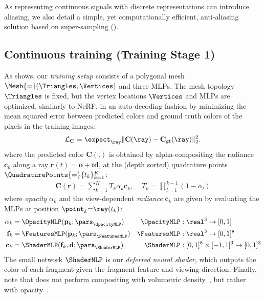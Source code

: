 As representing continuous signals with discrete representations can introduce aliasing, we also detail a simple, yet computationally efficient, anti-aliasing solution based on super-sampling ().


\subsection{Continuous training (Training Stage 1)}
\label{sec:stage1}
As  shows, our \textit{training setup} consists of a polygonal mesh $\Mesh{=}(\Triangles,\Vertices)$ and three MLPs.
The mesh topology $\Triangles$ is fixed, but the vertex locations $\Vertices$ and MLPs are optimized, similarly to NeRF, in an auto-decoding fashion by minimizing the mean squared error between predicted colors and ground truth colors of the pixels in the training images\floatersfootnote{}:
\begin{align}
\mathcal{L}_\mathbf{C} = \expect_{\ray}
\| \mathbf{C}(\ray) - \mathbf{C}_\text{gt}(\ray) \|_2^2.
\label{eq:rgb_reconstruction}
\end{align}
where the predicted color $\mathbf{C}(.)$ is obtained by alpha-compositing the radiance $\mathbf{c}_k$ along a ray $\mathbf{r}(t) {=} \mathbf{o} + t \mathbf{d}$, at the (depth sorted) quadrature points $\QuadraturePoints{=}\{t_k\}_{k=1}^K$:
\begin{align}
\mathbf{C}(\mathbf{r}) =
\sum_{k = 1}^{K}
T_k \alpha_k \mathbf{c}_k, \;\;\;\;
T_k = \prod_{l=1}^{k-1}(1-\alpha_l)
\label{eq:alpha_compositing}
\end{align}
where \textit{opacity} $\alpha_k$ and the view-dependent \textit{radiance} $\mathbf{c}_k$ are given by evaluating the MLPs at position $\point_k {=} \ray(t_k)$:
\begin{align}
\alpha_k &= \OpacityMLP(\mathbf{p}_k; \pars_\OpacityMLP)& \OpacityMLP &: \real^3 \rightarrow [0,1]
\label{eq:opacity}
\\
\mathbf{f}_k &= \FeaturesMLP(\mathbf{p}_k; \pars_\FeaturesMLP)& \FeaturesMLP &: \real^3 \rightarrow [0,1]^8
\label{eq:features}
\\
\mathbf{c}_k &= \ShaderMLP(\mathbf{f}_k,\mathbf{d}; \pars_\ShaderMLP)&  \ShaderMLP &: [0,1]^8 \times [-1,1]^3 \rightarrow [0,1]^3
\label{eq:color}
\end{align}
The small network $\ShaderMLP$ is our \textit{deferred neural shader}, which outputs the color of each fragment given the fragment feature and viewing direction.
Finally, note that  does not perform compositing with volumetric density~\cite{mildenhall2020nerf}, but rather with opacity~\cite[Eq.8]{attal2022learning}.


